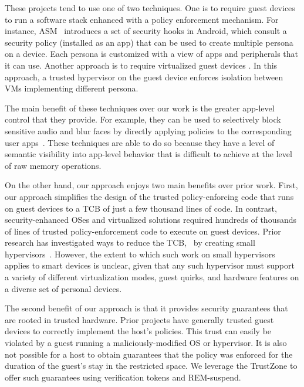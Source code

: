 These projects tend to use one of two techniques. One is to require guest
devices to run a software stack enhanced with a policy enforcement mechanism.
For instance, ASM~\cite{asm:sec14} introduces a set of security hooks in
Android, which consult a security policy (installed as an app) that can be used
to create multiple persona on a device. Each persona is customized with a view
of apps and peripherals that it can use. Another approach is to require
virtualized guest devices
\cite{cells:sosp11,cox:hotmobile07,vmwareverizon,kvmarm:asplos14}. In this
approach, a trusted hypervisor on the guest device enforces isolation between
VMs implementing different persona.

The main benefit of these techniques over our work is the greater app-level
control that they provide. For example, they can be used to selectively block
sensitive audio and blur faces by directly applying policies to the
corresponding user apps~\cite{worlddriven:ccs14,ar:sec13}. These techniques
are able to do so because they have a level of semantic visibility into
app-level behavior that is difficult to achieve at the level of raw memory
operations.

On the other hand, our approach enjoys two main benefits over prior work.
First, our approach simplifies the design of the trusted policy-enforcing code
that runs on guest devices to a TCB of just a few thousand lines of code. In
contrast, security-enhanced OSes and virtualized solutions required hundreds of
thousands of lines of trusted policy-enforcement code to execute on guest
devices.  Prior research has investigated ways to reduce the TCB, \eg~by
creating small hypervisors~\cite{nova:eurosys09}. However, the extent to which
such work on small hypervisors applies to smart devices is unclear, given that
any such hypervisor must support a variety of different virtualization modes,
guest quirks, and hardware features on a diverse set of personal devices.

The second benefit of our approach is that it provides security guarantees that
are rooted in trusted hardware. Prior projects have generally trusted guest
devices to correctly implement the host's policies. This trust can easily be
violated by a guest running a maliciously-modified OS or hypervisor.  It is
also not possible for a host to obtain guarantees that the policy was enforced
for the duration of the guest's stay in the restricted space. We leverage the
TrustZone to offer such guarantees using verification tokens and REM-suspend.

